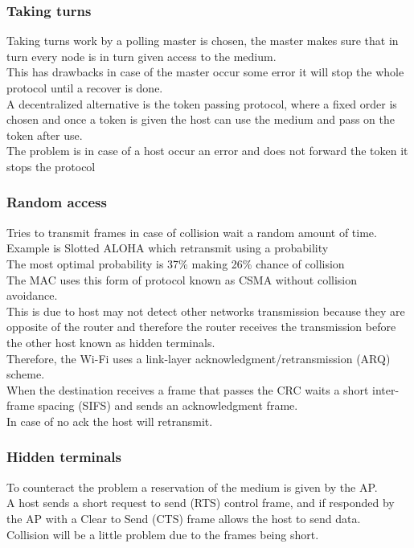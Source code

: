 \documentclass[12pt, a4paper]{article}
\begin{document}
		\subsubsection{Taking turns}
			Taking turns work by a polling master is chosen, the master makes sure that in turn every node is in turn given access to the medium.\\
			This has drawbacks in case of the master occur some error it will stop the whole protocol until a recover is done.\\
			A decentralized alternative is the token passing protocol, where a fixed order is chosen and once a token is given the host can use the medium and pass on the token after use.\\
			The problem is in case of a host occur an error and does not forward the token it stops the protocol
		\subsubsection{Random access}
			Tries to transmit frames in case of collision wait a random amount of time.\\
			Example is Slotted ALOHA which retransmit using a probability\\
			The most optimal probability is 37\% making 26\% chance of collision\\
			The MAC uses this form of protocol known as CSMA without collision avoidance.\\
			This is due to host may not detect other networks transmission because they are opposite of the router and therefore the router receives the transmission before the other host known as hidden terminals.\\
			Therefore, the Wi-Fi uses a link-layer acknowledgment/retransmission (ARQ) scheme.\\
			When the destination receives a frame that passes the CRC waits a short inter-frame spacing (SIFS) and sends an acknowledgment frame.\\
			In case of no ack the host will retransmit.\\
		\subsubsection{Hidden terminals}
			To counteract the problem a reservation of the medium is given by the AP.\\
			A host sends a short request to send (RTS) control frame, and if responded by the AP with a Clear to Send (CTS) frame allows the host to send data.\\
			Collision will be a little problem due to the frames being short.\\
\end{document}
